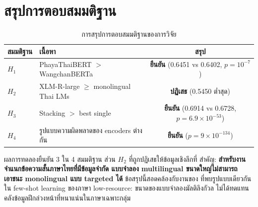 \section{สรุปการตอบสมมติฐาน}
\label{sec:results-summary}

\begin{table}[H]
\centering
\caption{การสรุปการตอบสมมติฐานของการวิจัย}
\label{tab:hypothesis-summary}
\begin{tabularx}{\textwidth}{lXc}
\toprule
\textbf{สมมติฐาน} & \textbf{เนื้อหา} & \textbf{สรุป} \\
\midrule
$H_1$ & PhayaThaiBERT $>$ WangchanBERTa & \textbf{ยืนยัน} (0.6451 vs 0.6402, $p=10^{-7}$) \\
$H_2$ & XLM-R-large $\geq$ monolingual Thai LMs & \textbf{ปฏิเสธ} (0.5450 ต่ำสุด) \\
$H_3$ & Stacking $>$ best single & \textbf{ยืนยัน} (0.6914 vs 0.6728, $p=6.9{\times}10^{-53}$) \\
$H_4$ & รูปแบบความผิดพลาดของ encoders ต่างกัน & \textbf{ยืนยัน} ($p=9{\times}10^{-134}$) \\
\bottomrule
\end{tabularx}
\end{table}

ผลการทดลองยืนยัน 3 ใน 4 สมมติฐาน ส่วน $H_2$ ที่ถูกปฏิเสธให้ข้อมูลเชิงลึกที่
สำคัญ: \textbf{สำหรับงานจำแนกข้อความสั้นภาษาไทยที่มีข้อมูลจำกัด แบบจำลอง
multilingual ขนาดใหญ่ไม่สามารถเอาชนะ monolingual แบบ targeted ได้}
ข้อสรุปนี้สอดคล้องกับงานของ \textcite{lin2022few} ที่พบรูปแบบเดียวกัน
ใน few-shot learning ของภาษา low-resource: ขนาดของแบบจำลองมัลติลิงกัวล
ไม่ได้ทดแทนคลังข้อมูลฝึกล่วงหน้าที่หนาแน่นในภาษาเฉพาะกลุ่ม
